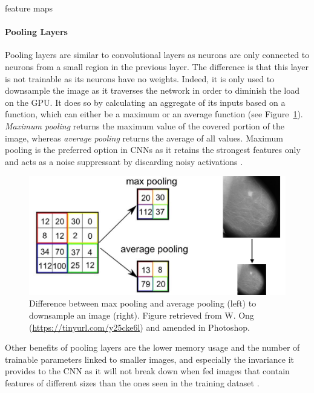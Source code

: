feature maps

\paragraph{Pooling Layers}

Pooling layers are similar to convolutional layers as neurons are only connected to neurons from a small region in the previous layer. The difference is that this layer is not trainable as its neurons have no weights. Indeed, it is only used to downsample the image as it traverses the network in order to diminish the load on the GPU. It does so by calculating an aggregate of its inputs based on a function, which can either be a maximum or an average function (see Figure~\ref{fig:litsurvey-max-vs-avg-pooling}). \textit{Maximum pooling} returns the maximum value of the covered portion of the image, whereas \textit{average pooling} returns the average of all values. Maximum pooling is the preferred option in CNNs as it retains the strongest features only and acts as a noise suppressant by discarding noisy activations \citep{Geron2019}.\\

\begin{figure}[ht]
\centerline{\includegraphics[width=\textwidth]{figures/litsurvey/max-vs-avg-pooling.png}}
\caption{\label{fig:litsurvey-max-vs-avg-pooling}Difference between max pooling and average pooling (left) to downsample an image (right). Figure retrieved from W. Ong (\url{https://tinyurl.com/y25cke6l}) and amended in Photoshop.}
\end{figure}

Other benefits of pooling layers are the lower memory usage and the number of trainable parameters linked to smaller images, and especially the invariance it provides to the CNN as it will not break down when fed images that contain features of different sizes than the ones seen in the training dataset \citep{Shen2017}.

